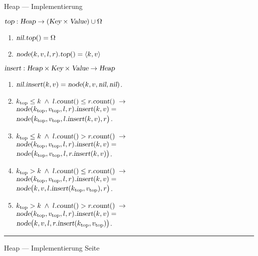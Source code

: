 \documentclass{slides}
\newcounter{mypage}
\def\pair(#1,#2){\langle #1, #2 \rangle}
\begin{document}
\begin{slide}{}
\normalsize

\begin{center}
Heap --- Implementierung
\end{center}
\vspace*{0.5cm}


\footnotesize
$\textsl{top}:\textsl{Heap} \rightarrow (\textsl{Key} \times \textsl{Value}) \cup \Omega$
\begin{enumerate}
\item $\textsl{nil}.\textsl{top}() = \Omega$
\item $\textsl{node}(k,v,l,r).\textsl{top}() = \pair(k,v)$
\end{enumerate}

$\textsl{insert}: \textsl{Heap} \times \textsl{Key} \times \textsl{Value} \rightarrow \textsl{Heap}$
\begin{enumerate}
\item $\textsl{nil}.\textsl{insert}(k,v) = \textsl{node}(k,v,\textsl{nil}, \textsl{nil})$.
\item $k_{\mathrm{top}} \leq k \;\wedge\; l.\textsl{count}() \leq r.\textsl{count}() \;\rightarrow $ \\[0.3cm]
      $\textsl{node}(k_{\mathrm{top}},v_\mathrm{top},l,r).\textsl{insert}(k,v) =$ \\[0.3cm]
      $\textsl{node}\bigl(k_\mathrm{top},v_\mathrm{top},l.\textsl{insert}(k,v), r\bigr)$.

\item $k_{\mathrm{top}} \leq k \;\wedge\; l.\textsl{count}() > r.\textsl{count}() \;\rightarrow $ \\[0.3cm]
      $\textsl{node}(k_{\mathrm{top}},v_\mathrm{top},l,r).\textsl{insert}(k,v) =$ \\[0.3cm]
      $\textsl{node}\bigl(k_\mathrm{top},v_\mathrm{top},l,r.\textsl{insert}(k,v)\bigr)$.

\item $k_{\mathrm{top}} > k \;\wedge\; l.\textsl{count}() \leq r.\textsl{count}() \;\rightarrow $ \\[0.3cm]
      $\textsl{node}(k_{\mathrm{top}},v_\mathrm{top},l,r).\textsl{insert}(k,v) =$ \\[0.3cm]
      $\textsl{node}\bigl(k,v,l.\textsl{insert}(k_\mathrm{top},v_\mathrm{top}), r\bigr)$.
\item $k_{\mathrm{top}} > k \;\wedge\; l.\textsl{count}() > r.\textsl{count}() \;\rightarrow $ \\[0.3cm] 
      $\textsl{node}(k_{\mathrm{top}},v_\mathrm{top},l,r).\textsl{insert}(k,v) =$ \\[0.3cm]
      $\textsl{node}\bigl(k,v,l,r.\textsl{insert}(k_\mathrm{top},v_\mathrm{top})\bigr)$.
\end{enumerate}


\vspace*{\fill}
\tiny \addtocounter{mypage}{1}
\rule{17cm}{1mm}
Heap --- Implementierung \hspace*{\fill} Seite 
\end{slide}
\end{document}
